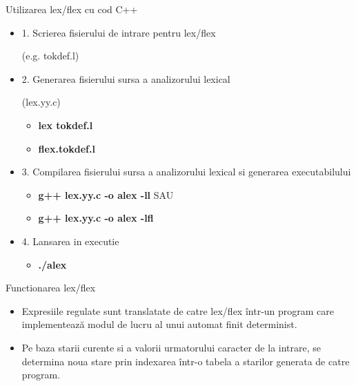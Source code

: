 \documentclass[pdf]{beamer}
\begin{document}
\begin{frame}{Utilizarea lex/flex cu cod C++}
\begin{itemize}
\item
1. Scrierea fisierului de intrare pentru lex/flex

(e.g. tokdef.l)

\item
2. Generarea fisierului sursa a analizorului lexical

(lex.yy.c)

\begin{itemize}
\item
\textbf{lex tokdef.l}  \color{red}{  SAU}\color{black}
\item
\textbf{flex.tokdef.l}
\end{itemize}

\item
3. Compilarea fisierului sursa a analizorului lexical si generarea executabilului

\begin{itemize}
\item
\textbf{\color{red} {g++ }\color{black} lex.yy.c -o alex -ll} \color{red} {  SAU}\color{black}
\item
\textbf{\color{red} {g++ }\color{black} lex.yy.c -o alex -lfl}
\end{itemize}

\item
4. Lansarea in executie

\begin{itemize}
\item
\textbf{./alex}
\end{itemize}
\end{itemize}
\end{frame}



\begin{frame}{Functionarea lex/flex}
\begin{itemize}
\item
Expresiile regulate sunt translatate de catre lex/flex într-un program care implementează modul de lucru al unui automat finit determinist.
\newline

\item
Pe baza starii curente si a valorii urmatorului caracter de la intrare, se determina noua stare prin indexarea într-o tabela a starilor generata de catre program.

\end{itemize}
\end{frame}
\end{document}
